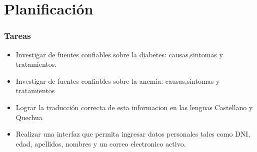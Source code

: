 \chapter{Planificación}

\subsection{Tareas}
\begin{itemize}
	\item  Investigar de fuentes confiables sobre la diabetes: causas,sintomas y tratamientos.
	\item Investigar de fuentes confiables sobre la anemia: 
	causas,sintomas y tratamientos
	\item Lograr la traducción correcta de esta informacion en las lenguas Castellano y Quechua
	\item Realizar una interfaz que permita ingresar datos personales tales como DNI, edad, apellidos, nombres y un correo electronico activo.
\end{itemize}


